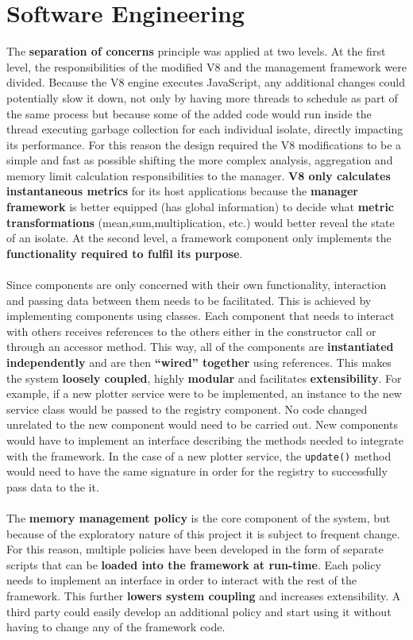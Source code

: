 \documentclass{l4proj}
\begin{document}
\section{Software Engineering}
\hspace*{1em} The \textbf{separation of concerns} principle was applied at two levels. At the first level, the responsibilities of the modified V8 and the management framework were divided. Because the V8 engine executes JavaScript, any additional changes could potentially slow it down, not only by having more threads to schedule as part of the same process but because some of the added code would run inside the thread executing garbage collection for each individual isolate, directly impacting its performance. For this reason the design required the V8 modifications to be a simple and fast as possible shifting the more complex analysis, aggregation and memory limit calculation responsibilities to the manager. \textbf{V8 only calculates instantaneous metrics} for its host applications because the \textbf{manager framework} is better equipped (has global information) to decide what \textbf{metric transformations} (mean,sum,multiplication, etc.) would better reveal the state of an isolate. At the second level, a framework component only implements the \textbf{functionality required to fulfil its purpose}.
\\\\
\hspace*{1em} Since components are only concerned with their own functionality, interaction and passing data between them needs to be facilitated. This is achieved by implementing components using classes. Each component that needs to interact with others receives references to the others either in the constructor call or through an accessor method. This way, all of the components are \textbf{instantiated independently} and are then \textbf{``wired'' together} using references. This makes the system \textbf{loosely coupled}, highly \textbf{modular} and facilitates \textbf{extensibility}. For example, if a new plotter service were to be implemented, an instance to the new service class would be passed to the registry component. No code changed unrelated to the new component would need to be carried out. New components would have to implement an interface describing the methods needed to integrate with the framework. In the case of a new plotter service, the \texttt{update()} method would need to have the same signature in order for the registry to successfully pass data to the it. 
\\\\
\hspace*{1em} The \textbf{memory management policy} is the core component of the system, but because of the exploratory nature of this project it is subject to frequent change. For this reason, multiple policies have been developed in the form of separate scripts that can be \textbf{loaded into the framework at run-time}. Each policy needs to implement an interface in order to interact with the rest of the framework. This further \textbf{lowers system coupling} and increases extensibility. A third party could easily develop an additional policy and start using it without having to change any of the framework code.
\newpage
\end{document}
